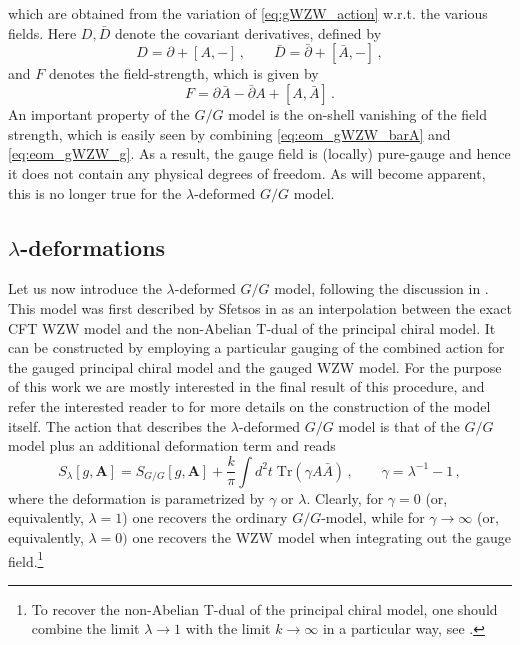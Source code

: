 \documentclass[11pt,a4paper]{article}
\numberwithin{equation}{section}
\numberwithin{table}{section}\setlength{\multlinegap}{25pt}
\begin{document}
which are obtained from the variation of \eqref{eq:gWZW_action} w.r.t. the various fields. Here $D,\bar{D}$ denote the covariant derivatives, defined by
\begin{equation}
	D = \partial + [A,-]\,,\qquad \bar{D} = \bar{\partial} + [\bar{A},-]\,,
\end{equation}
and $F$ denotes the field-strength, which is given by 
\begin{equation}
	F = \partial \bar{A} - \bar{\partial}A + [A,\bar{A}]\,.
\end{equation}
An important property of the $G/G$ model is the on-shell vanishing of the field strength, which is easily seen by combining \eqref{eq:eom_gWZW_barA} and \eqref{eq:eom_gWZW_g}. As a result, the gauge field is (locally) pure-gauge and hence it does not contain any physical degrees of freedom. As will become apparent, this is no longer true for the $\lambda$-deformed $G/G$ model.

\subsection{$\lambda$-deformations}
\label{subsec:lambda_G/G}

Let us now introduce the $\lambda$-deformed $G/G$ model, following the discussion in \cite{Hollowood:2014}. This model was first described by Sfetsos in \cite{Sfetsos:2014_integrability} as an interpolation between the exact CFT WZW model and the non-Abelian T-dual of the principal chiral model. It can be constructed by employing a particular gauging of the combined action for the gauged principal chiral model and the gauged WZW model. For the purpose of this work we are mostly interested in the final result of this procedure, and refer the interested reader to \cite{Sfetsos:2014_integrability,Hollowood:2014} for more details on the construction of the model itself. The action that describes the $\lambda$-deformed $G/G$ model is that of the $G/G$ model plus an additional deformation term and reads
\begin{equation}
	\label{eq:lambda_gWZW_action}
	\boxed{
		\quad S_{\lambda}[g,\mathbf{A}] = S_{G/G}[g,\mathbf{A}]+\frac{k}{\pi} \int d^2t\;\mathrm{Tr}\left(\gamma A\bar{A} \right)\,,\qquad \gamma = \lambda^{-1}-1\,,\quad}
\end{equation}
where the deformation is parametrized by $\gamma$ or $\lambda$. Clearly, for $\gamma=0$ (or, equivalently, $\lambda=1$) one recovers the ordinary $G/G$-model, while for $\gamma\rightarrow\infty$ (or, equivalently, $\lambda = 0)$ one recovers the WZW model when integrating out the gauge field.\footnote{To recover the non-Abelian T-dual of the principal chiral model, one should combine the limit $\lambda\rightarrow 1$ with the limit $k\rightarrow \infty$ in a particular way, see \cite{Sfetsos:2014_integrability}.} 
\end{document}
